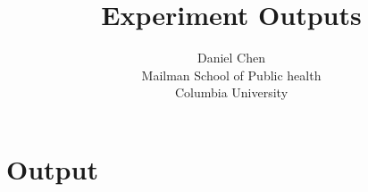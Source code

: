 \documentclass{article}\usepackage[]{graphicx}\usepackage[]{color}
\title{Experiment Outputs}
\author{Daniel Chen \\ Mailman School of Public health \\ Columbia University}
\date{}
\begin{document}
\maketitle
\tableofcontents

\newpage
\section{Output}
%
%
\end{document}
